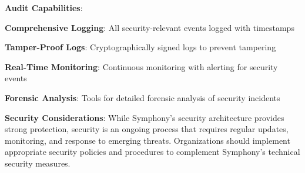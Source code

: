 \textbf{Audit Capabilities}:
\begin{compactlist}
    \item \textbf{Comprehensive Logging}: All security-relevant events logged with timestamps
    \item \textbf{Tamper-Proof Logs}: Cryptographically signed logs to prevent tampering
    \item \textbf{Real-Time Monitoring}: Continuous monitoring with alerting for security events
    \item \textbf{Forensic Analysis}: Tools for detailed forensic analysis of security incidents
\end{compactlist}

\begin{alertbox}
\textbf{Security Considerations}: While Symphony's security architecture provides strong protection, security is an ongoing process that requires regular updates, monitoring, and response to emerging threats. Organizations should implement appropriate security policies and procedures to complement Symphony's technical security measures.
\end{alertbox}
